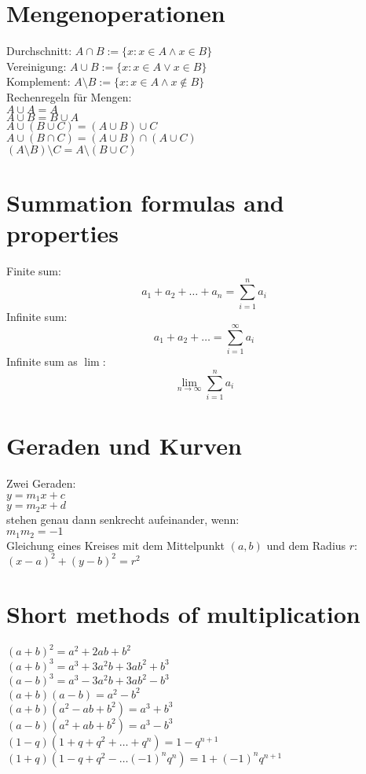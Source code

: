 \documentclass[a4paper, 10pt]{scrartcl}
\begin{document}
\setlength{\parindent}{0em}

\section*{Mengenoperationen}
Durchschnitt: $A\cap B := \{x: x\in A \wedge x\in B\}$\\
Vereinigung: $A\cup B := \{x: x\in A \vee x\in B\}$\\
Komplement: $A\setminus B := \{x: x\in A \wedge x\notin B\}$\\

Rechenregeln für Mengen:\\
$A\cup A = A$\\
$A\cup B = B\cup A$\\
$A\cup (B\cup C) = (A\cup B)\cup C$\\
$A\cup (B\cap C) = (A\cup B)\cap (A\cup C)$\\
$(A\setminus B)\setminus C = A\setminus (B\cup C)$\\

\section*{Summation formulas and properties}
Finite sum:
\[
a_{1} + a_{2} + \dots + a_{n} = \sum_{i=1}^{n}a_{i}
\]
Infinite sum:
\[
a_{1} + a_{2} + \dots = \sum_{i=1}^{\infty}a_{i}
\]
Infinite sum as $\lim$:\\
\[
\lim_{n\to\infty}\sum_{i=1}^{n}a_{i}
\]

\section*{Geraden und Kurven}
Zwei Geraden:\\
$y = m_{1}x + c$\\
$y = m_{2}x + d$\\
stehen genau dann senkrecht aufeinander, wenn:\\
$m_{1}m_{2} = -1$\\

Gleichung eines Kreises mit dem Mittelpunkt $(a, b)$
und dem Radius $r$:\\
$(x - a)^{2} + (y - b)^{2} = r^{2}$\\

\section*{Short methods of multiplication}
$(a + b)^{2} = a^{2} + 2ab + b^{2}$\\
$(a + b)^{3} = a^{3} + 3a^{2}b + 3ab^{2} + b^{3}$\\
$(a - b)^{3} = a^{3} - 3a^{2}b + 3ab^{2} - b^{3}$\\
$(a + b)(a - b) = a^{2} - b^{2}$\\
$(a + b)(a^{2} - ab + b^{2}) = a^{3} + b^{3}$\\
$(a - b)(a^{2} + ab + b^{2}) = a^{3} - b^{3}$\\
$(1 - q)(1 + q + q^{2} + \dots + q^{n}) = 1 - q^{n+1}$\\
$(1 + q)(1 - q + q^{2} - \dots (-1)^{n}q^{n}) = 1 + (-1)^{n}q^{n+1}$\\
\end{document}
